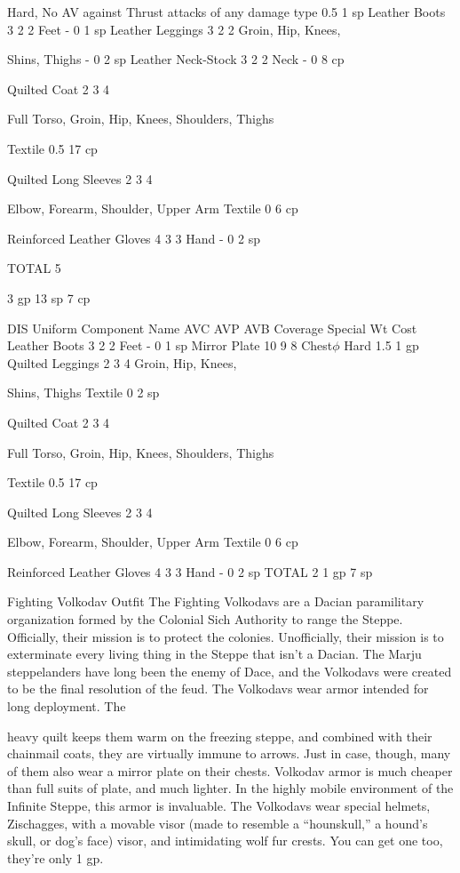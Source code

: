 \documentclass[oneside,11pt,english]{book}
\begin{document}
Hard, No AV against Thrust 
attacks of any damage type 0.5 1 sp
Leather Boots 3 2 2 Feet - 0 1 sp
Leather Leggings 3 2 2 Groin, Hip, Knees, 

Shins, Thighs - 0 2 sp
Leather Neck-Stock 3 2 2 Neck - 0 8 cp

Quilted Coat 2 3 4

Full Torso, Groin, Hip, 
Knees, Shoulders, 
Thighs

Textile 0.5 17 cp

Quilted Long 
Sleeves 2 3 4

Elbow, Forearm, 
Shoulder, Upper Arm Textile 0 6 cp

Reinforced Leather
Gloves 4 3 3 Hand - 0 2 sp

TOTAL 5

3 gp
13 sp
7 cp

DIS Uniform
Component Name AVC AVP AVB Coverage Special Wt Cost
Leather Boots 3 2 2 Feet - 0 1 sp
Mirror Plate 10 9 8 Chest$\phi$ Hard 1.5 1 gp
Quilted Leggings 2 3 4 Groin, Hip, Knees, 

Shins, Thighs Textile 0 2 sp

Quilted Coat 2 3 4

Full Torso, Groin, Hip, 
Knees, Shoulders, 
Thighs

Textile 0.5 17 cp

Quilted Long 
Sleeves 2 3 4

Elbow, Forearm, 
Shoulder, Upper Arm Textile 0 6 cp

Reinforced Leather
Gloves 4 3 3 Hand - 0 2 sp
TOTAL 2 1 gp
7 sp

Fighting Volkodav Outfit
The Fighting Volkodavs are a Dacian paramilitary organization formed by the Colonial Sich Authority to range the 
Steppe. Officially, their mission is to protect the colonies. Unofficially, their mission is to exterminate every living 
thing in the Steppe that isn't a Dacian. The Marju steppelanders have long been the enemy of Dace, and the Volkodavs
were created to be the final resolution of the feud. The Volkodavs wear armor intended for long deployment. The 


heavy quilt keeps them warm on the freezing steppe, and combined with their chainmail coats, they are virtually 
immune to arrows. Just in case, though, many of them also wear a mirror plate on their chests. Volkodav armor is 
much cheaper than full suits of plate, and much lighter. In the highly mobile environment of the Infinite Steppe, this 
armor is invaluable. The Volkodavs wear special helmets, Zischagges, with a movable visor (made to resemble a 
“hounskull,” a hound's skull, or dog's face) visor, and intimidating wolf fur crests. You can get one too, they're only 1 
gp.
\end{document}
